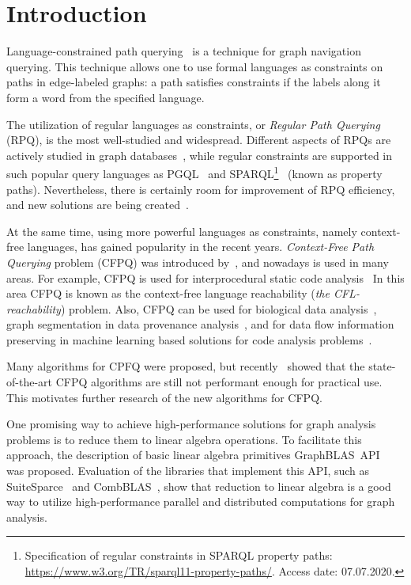 \section{Introduction}


Language-constrained path querying~\citep{barrett2000formal} is a technique for graph navigation querying.
This technique allows one to use formal languages as constraints on paths in edge-labeled graphs: a path satisfies constraints if the labels along it form a word from the specified language.

The utilization of regular languages as constraints, or \textit{Regular Path Querying} (RPQ), is the most well-studied and widespread.
Different aspects of RPQs are actively studied in graph databases~\citep{10.1145/2463664.2465216, 10.1145/3104031,10.1145/2850413}, while regular constraints are supported in such popular query languages as PGQL~\citep{10.1145/2960414.2960421} and SPARQL\footnote{Specification of regular constraints in SPARQL property paths: \url{https://www.w3.org/TR/sparql11-property-paths/}. Access date: 07.07.2020.}~\citep{10.1007/978-3-319-25007-6_1} (known as property paths).
Nevertheless, there is certainly room for improvement of RPQ efficiency, and new solutions are being created~\citep{Wang2019,10.1145/2949689.2949711}.

At the same time, using more powerful languages  as constraints, namely context-free languages, has gained popularity in the recent years.
\textit{Context-Free Path Querying} problem (CFPQ) was introduced by~\cite{Yannakakis}, and nowadays is used in many areas.
For example, CFPQ is used for interprocedural static code analysis~\citep{10.1145/3158118,10.5555/271338.271343, YanSCA, Zheng:2008:DAA:1328897.1328464}
In this area CFPQ is known as the context-free language reachability (\textit{the CFL-reachability}) problem.
Also, CFPQ can be used for biological data analysis~\citep{GraphQueryWithEarley}, graph segmentation in data provenance analysis~\citep{8731467}, and for data flow information preserving in machine learning based solutions for code analysis problems~\citep{10.1145/3428301}.

Many algorithms for CPFQ were proposed, but recently~\cite{Kuijpers:2019:ESC:3335783.3335791} showed that the state-of-the-art CFPQ algorithms are still not performant enough for practical use.
This motivates further research of the new algorithms for CFPQ.

One promising way to achieve high-performance solutions for graph analysis problems is to reduce them to linear algebra operations.
To facilitate this approach, the description of basic linear algebra primitives GraphBLAS~API~\citep{7761646} was proposed.
Evaluation of the libraries that implement this API, such as SuiteSparce~\citep{10.1145/3322125} and CombBLAS~\citep{10.1177/1094342011403516}, show that reduction to linear algebra is a good way to utilize high-performance parallel and distributed computations for graph analysis.


